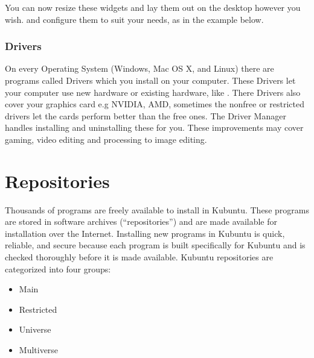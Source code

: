 \documentclass[letterpaper,10pt,english]{sphinxmanual}
\begin{document}
\sphinxAtStartPar
You can now resize these widgets and lay them out on the desktop however you wish. and configure them to suit your needs, as in the example below.



\subsection{Drivers}
\label{\detokenize{docs/advanced:drivers}}
\sphinxAtStartPar
On every Operating System (Windows, Mac OS X, and Linux) there are programs called Drivers which you install on your computer. These Drivers let your computer use new hardware or existing hardware, like . There Drivers also cover your graphics card e.g NVIDIA, AMD, sometimes the nonfree or restricted drivers let the cards perform better than the free ones. The Driver Manager handles installing and uninstalling these for you. These improvements may cover gaming, video editing and processing to image editing.


\chapter{Repositories}
\label{\detokenize{docs/repositories:repositories}}\label{\detokenize{docs/repositories:repositories-link}}\label{\detokenize{docs/repositories::doc}}
\sphinxAtStartPar
Thousands of programs are freely available to install in Kubuntu. These programs are stored in software archives (“repositories”) and are made available for installation over the Internet. Installing new programs in Kubuntu is quick, reliable, and secure because each program is built specifically for Kubuntu and is checked thoroughly before it is made available. Kubuntu repositories are categorized into four groups:
\begin{itemize}
\item {} 
\sphinxAtStartPar
Main

\item {} 
\sphinxAtStartPar
Restricted

\item {} 
\sphinxAtStartPar
Universe

\item {} 
\sphinxAtStartPar
Multiverse

\end{itemize}
\end{document}
